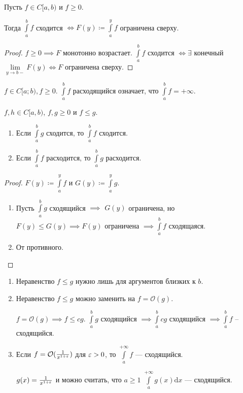 \begin{theorem}
    Пусть  $f \in C[a, b)$ и  $f \ge 0$. 

    Тогда $\int\limits_a^b f$ сходится  $\iff F(y) \coloneqq \int\limits_a^y f$ ограничена сверху.
\end{theorem}
\begin{proof}
    $f \ge 0 \implies F$ монотонно возрастает. $\int\limits_a^b f$ сходится  $\iff \exists$ конечный  $\lim\limits_{y \to b-}F(y) \iff F$ ограничена сверху. 
\end{proof}
\begin{remark}
    $f \in C[a; b), f\ge 0$. $\int\limits_a^b f$ расходящийся означает, что  $\int\limits_a^b f = +\infty$.
\end{remark}
\begin{consequence}
    $f, h \in C[a, b)$,  $f, g \ge 0$ и $f \le g$.
    \begin{enumerate}
        \item Если $\int\limits_a^b g$ сходится, то  $\int\limits_a^b f$ сходится.
        \item Если  $\int\limits_a^b f$ расходится, то  $\int\limits_a^b g$ расходится.
    \end{enumerate}
\end{consequence}
\begin{proof}
    $F(y) \coloneqq \int\limits_a^y f$ и  $G(y) \coloneqq \int\limits_a^y g$.
     \begin{enumerate}
         \item Пусть $\int\limits_a^b g$ сходящийся  $\implies$  $G(y)$ ограничена, но  $F(y) \le G(y) \implies F(y)$ ограничена $\implies \int\limits_a^b f$ сходящаяся.
         \item От противного.
    \end{enumerate}
\end{proof}
\begin{remark}
    \begin{enumerate}
        \item Неравенство $f \le g$ нужно лишь для аргументов близких к $b$.
        \item Неравенство  $f \le g$ можно заменить на $f = \mathcal{O}(g)$.

            $f = \mathcal{O}(g) \implies f \le cg$. $\int\limits_a^b g$ сходящийся  $\implies \int\limits_a^b cg $ сходящийся  $\implies \int\limits_a^b f$ -- сходящийся.
        \item Если  $f = \mathcal{O}(\frac{1}{x^{1 + \varepsilon}})$ для $\varepsilon > 0$, то  $\int\limits_a^{+\infty} f$ --- сходящийся.

            $g(x) = \frac{1}{x^{1+\varepsilon}}$ и можно считать, что $a \ge 1$ $\int\limits_a^{+\infty} g(x) \mathrm{d}x$ --- сходящийся.
    \end{enumerate}
\end{remark}
